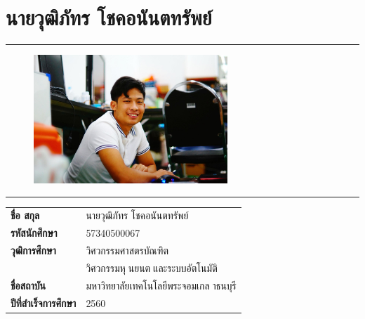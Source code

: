 \section*{นายวุฒิภัทร โชคอนันตทรัพย์}
\hrule height .7pt
\begin{figure}[!ht]
	\centering
	\includegraphics[width=0.65\textwidth]{pages/images/wuttipat.jpg}
\end{figure}
\hrule height .7pt
\raggedright
\begin{tabular}{p{} p{}}
    \textbf{ชื่อ สกุล} & {นายวุฒิภัทร โชคอนันตทรัพย์} \\
    \textbf{รหัสนักศึกษา} & {57340500067}\\
    \textbf{วุฒิการศึกษา} & {วิศวกรรมศาสตรบัณฑิต} \\
    {} & {วิศวกรรมหุนยนตและระบบอัตโนมัติ}\\
    \textbf{ชื่อสถาบัน} & {มหาวิทยาลัยเทคโนโลยีพระจอมเกลาธนบุรี} \\
    \textbf{ปีที่สำเร็จการศึกษา} & {2560} \\
\end{tabular}   

